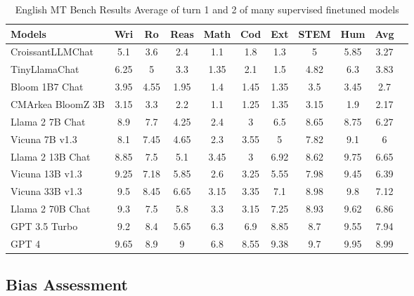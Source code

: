 \begin{table}[h]
\centering
\begin{tabular}{lcccccccccc}
\hline
Models & Wri & Ro & Reas & Math & Cod & Ext & STEM & Hum & Avg \\
\hline
CroissantLLMChat      & 5.1     & 3.6      & 2.4       & 1.1  & 1.8   & 1.3        & 5    & 5.85       & 3.27    \\
TinyLlamaChat         & 6.25    & 5        & 3.3       & 1.35 & 2.1   & 1.5        & 4.82 & 6.3        & 3.83    \\
Bloom 1B7 Chat        & 3.95    & 4.55     & 1.95      & 1.4  & 1.45  & 1.35       & 3.5  & 3.45       & 2.7     \\
CMArkea BloomZ 3B     & 3.15    & 3.3      & 2.2       & 1.1  & 1.25  & 1.35       & 3.15 & 1.9       & 2.17    \\
\hline
Llama 2 7B Chat       & 8.9     & 7.7      & 4.25      & 2.4  & 3     & 6.5        & 8.65 & 8.75      & 6.27    \\
Vicuna 7B v1.3        & 8.1     & 7.45     & 4.65      & 2.3  & 3.55  & 5          & 7.82 & 9.1       & 6       \\
Llama 2 13B Chat      & 8.85    & 7.5      & 5.1       & 3.45 & 3     & 6.92       & 8.62 & 9.75      & 6.65    \\
Vicuna 13B v1.3       & 9.25    & 7.18     & 5.85      & 2.6  & 3.25  & 5.55       & 7.98 & 9.45      & 6.39    \\
Vicuna 33B v1.3       & 9.5     & 8.45     & 6.65      & 3.15 & 3.35  & 7.1        & 8.98 & 9.8       & 7.12    \\
Llama 2 70B Chat      & 9.3     & 7.5      & 5.8       & 3.3  & 3.15  & 7.25       & 8.93 & 9.62      & 6.86    \\
GPT 3.5 Turbo         & 9.2     & 8.4      & 5.65      & 6.3  & 6.9   & 8.85       & 8.7  & 9.55      & 7.94    \\
GPT 4                 & 9.65    & 8.9      & 9         & 6.8  & 8.55  & 9.38       & 9.7  & 9.95      & 8.99    \\
\hline
\end{tabular}
\caption[English MT Bench average]{English MT Bench Results Average of turn 1 and 2 of many supervised finetuned models}
\label{tab:mt_bench_all_en}
\end{table}


\subsection{Bias Assessment}

